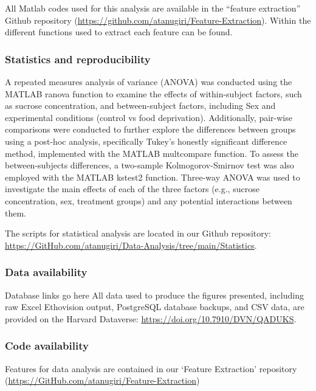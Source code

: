\documentclass{article}
\begin{document}
All Matlab codes used for this analysis are available in the “feature extraction” Github repository (\url{https://github.com/atanugiri/Feature-Extraction}). Within the different functions used to extract each feature can be found.

\clearpage

\subsubsection{Statistics and reproducibility}
A repeated measures analysis of variance (ANOVA) was conducted using the MATLAB ranova function to examine the effects of within-subject factors, such as sucrose concentration, and between-subject factors, including Sex and experimental conditions (control vs food deprivation). Additionally, pair-wise comparisons were conducted to further explore the differences between groups using a post-hoc analysis, specifically Tukey’s honestly significant difference method, implemented with the MATLAB multcompare function. To assess the between-subjects differences, a two-sample Kolmogorov-Smirnov test was also employed with the MATLAB kstest2 function. Three-way ANOVA was used to investigate the main effects of each of the three factors (e.g., sucrose concentration, sex, treatment groups) and any potential interactions between them.

The scripts for statistical analysis are located in our Github repository: \url{https://GitHub.com/atanugiri/Data-Analysis/tree/main/Statistics}.

\clearpage

\subsubsection{Data availability}
Database links go here All data used to produce the figures presented, including raw Excel Ethovision output, PostgreSQL database backups, and CSV data, are provided on the Harvard Dataverse\cite{ibanez2024record}: \url{https://doi.org/10.7910/DVN/QADUKS}.

\vspace{1em}

\subsubsection{Code availability}
Features for data analysis are contained in our ‘Feature Extraction’ repository (\url{https://GitHub.com/atanugiri/Feature-Extraction})
\end{document}
